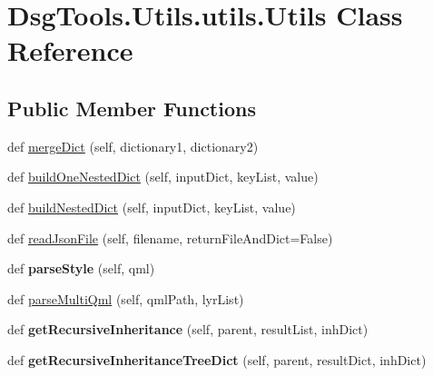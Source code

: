 \hypertarget{class_dsg_tools_1_1_utils_1_1utils_1_1_utils}{}\section{Dsg\+Tools.\+Utils.\+utils.\+Utils Class Reference}
\label{class_dsg_tools_1_1_utils_1_1utils_1_1_utils}
\subsection*{Public Member Functions}
\begin{DoxyCompactItemize}
\item 
def \mbox{\hyperlink{class_dsg_tools_1_1_utils_1_1utils_1_1_utils_ab57951edce702c5640e2ded9c4671c1e}{merge\+Dict}} (self, dictionary1, dictionary2)
\item 
def \mbox{\hyperlink{class_dsg_tools_1_1_utils_1_1utils_1_1_utils_a02133bd06c1d3fcd6319e7a59256d7e3}{build\+One\+Nested\+Dict}} (self, input\+Dict, key\+List, value)
\item 
def \mbox{\hyperlink{class_dsg_tools_1_1_utils_1_1utils_1_1_utils_ad03cd0daee48819be7fbb0f1bb30c4d0}{build\+Nested\+Dict}} (self, input\+Dict, key\+List, value)
\item 
def \mbox{\hyperlink{class_dsg_tools_1_1_utils_1_1utils_1_1_utils_a6e911bdef39886b4f1056d746388294c}{read\+Json\+File}} (self, filename, return\+File\+And\+Dict=False)
\item 
\mbox{\label{class_dsg_tools_1_1_utils_1_1utils_1_1_utils_ad0c9e8201dcb10dd2d98447f31155c7e}} 
def {\bfseries parse\+Style} (self, qml)
\item 
def \mbox{\hyperlink{class_dsg_tools_1_1_utils_1_1utils_1_1_utils_a340feb10d8eb550fbc1ebd5d62f2e022}{parse\+Multi\+Qml}} (self, qml\+Path, lyr\+List)
\item 
\mbox{\label{class_dsg_tools_1_1_utils_1_1utils_1_1_utils_ae1e331019b91e81cbf8ce4cb5e97e267}} 
def {\bfseries get\+Recursive\+Inheritance} (self, parent, result\+List, inh\+Dict)
\item 
\mbox{\label{class_dsg_tools_1_1_utils_1_1utils_1_1_utils_a86c33fc30ea99f4a11d0553f432f5122}} 
def {\bfseries get\+Recursive\+Inheritance\+Tree\+Dict} (self, parent, result\+Dict, inh\+Dict)

\end{DoxyCompactItemize}
